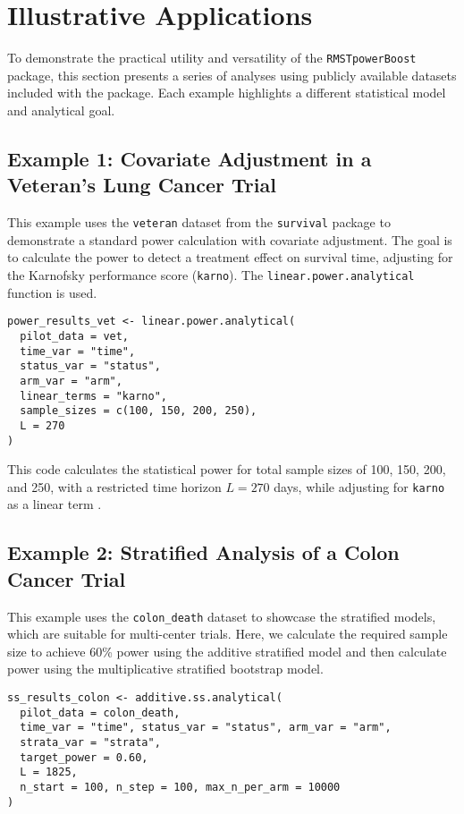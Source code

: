 \documentclass[article]{jss}
\begin{document}
\section{Illustrative Applications}
To demonstrate the practical utility and versatility of the \texttt{RMSTpowerBoost} package, this section presents a series of analyses using publicly available datasets included with the package. Each example highlights a different statistical model and analytical goal.

\subsection{Example 1: Covariate Adjustment in a Veteran's Lung Cancer Trial}
This example uses the \texttt{veteran} dataset from the \texttt{survival} package to demonstrate a standard power calculation with covariate adjustment. The goal is to calculate the power to detect a treatment effect on survival time, adjusting for the Karnofsky performance score (\texttt{karno}). The \texttt{linear.power.analytical} function is used.

\begin{lstlisting}
power_results_vet <- linear.power.analytical(
  pilot_data = vet,
  time_var = "time",
  status_var = "status",
  arm_var = "arm",
  linear_terms = "karno",
  sample_sizes = c(100, 150, 200, 250),
  L = 270
)
\end{lstlisting}

This code calculates the statistical power for total sample sizes of 100, 150, 200, and 250, with a restricted time horizon $L=270$ days, while adjusting for \texttt{karno} as a linear term \cite{[1]}.

\subsection{Example 2: Stratified Analysis of a Colon Cancer Trial}
This example uses the \texttt{colon\_death} dataset to showcase the stratified models, which are suitable for multi-center trials. Here, we calculate the required sample size to achieve 60\% power using the additive stratified model and then calculate power using the multiplicative stratified bootstrap model.

\begin{lstlisting}
ss_results_colon <- additive.ss.analytical(
  pilot_data = colon_death,
  time_var = "time", status_var = "status", arm_var = "arm", 
  strata_var = "strata",
  target_power = 0.60,
  L = 1825,
  n_start = 100, n_step = 100, max_n_per_arm = 10000
)
\end{lstlisting}
\end{document}

